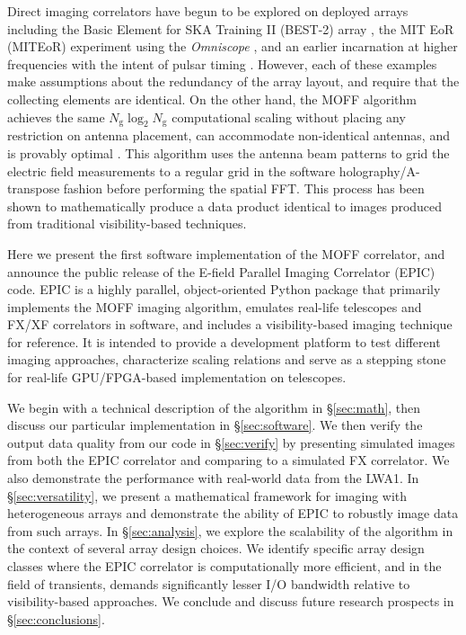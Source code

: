\documentclass[a4paper,fleqn,usenatbib]{mnras}
\newcommand{\Ngrid}{N_\textrm{g}}
\begin{document}
Direct imaging correlators have begun to be explored on deployed arrays including the Basic Element for SKA Training II (BEST-2) array \citep{fos14}, the MIT EoR (MITEoR) experiment \citep{zhe14} using the {\it Omniscope} \citep{teg09,teg10}, and an earlier incarnation at higher frequencies with the intent of pulsar timing \citep{oto94,dai00}. However, each of these examples make assumptions about the redundancy of the array layout, and require that the collecting elements are identical. On the other hand, the MOFF algorithm achieves the same $\Ngrid \log_2 \Ngrid$ computational scaling without placing any restriction on antenna placement, can accommodate non-identical antennas, and is provably optimal \citep{mor11}. This algorithm uses the antenna beam patterns to grid the electric field measurements to a regular grid in the software holography/A-transpose fashion \citep{mor09,bha08,teg97b} before performing the spatial FFT. This process has been shown to mathematically produce a data product identical to images produced from traditional visibility-based techniques.

Here we present the first software implementation of the MOFF correlator, and announce the public release of the E-field Parallel Imaging Correlator (EPIC) code. EPIC is a highly parallel, object-oriented Python package that primarily implements the MOFF imaging algorithm, emulates real-life telescopes and FX/XF correlators in software, and includes a visibility-based imaging technique for reference. It is intended to provide a development platform to test different imaging approaches, characterize scaling relations and serve as a stepping stone for real-life GPU/FPGA-based implementation on telescopes.

We begin with a technical description of the algorithm in \S\ref{sec:math}, then discuss our particular implementation in \S\ref{sec:software}. We then verify the output data quality from our code in \S\ref{sec:verify} by presenting simulated images from both the EPIC correlator and comparing to a simulated FX correlator. We also demonstrate the performance with real-world data from the LWA1. In \S\ref{sec:versatility}, we present a mathematical framework for imaging with heterogeneous arrays and demonstrate the ability of EPIC to robustly image data from such arrays. In \S\ref{sec:analysis}, we explore the scalability of the algorithm in the context of several array design choices. We identify specific array design classes where the EPIC correlator is computationally more efficient, and in the field of transients, demands significantly lesser I/O bandwidth relative to visibility-based approaches. We conclude and discuss future research prospects in \S\ref{sec:conclusions}.
\end{document}
